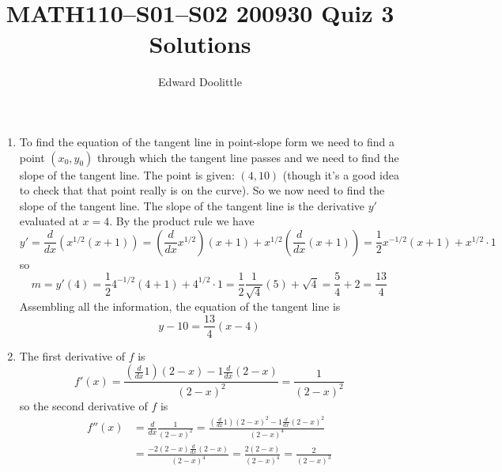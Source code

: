 \documentclass[12pt]{article}
\title{MATH110--S01--S02 200930 Quiz 3 Solutions}
\author{Edward Doolittle}
\begin{document}
\maketitle

\begin{enumerate}
\item To find the equation of the tangent line in point-slope form we need
  to find a point $(x_0,y_0)$ through which the tangent line passes and
  we need to find
  the slope of the tangent line.  The point is given: $(4,10)$ (though it's
  a good idea to check that that point really is on the curve).  So we now need
  to find the slope of the tangent line.  The slope of the tangent line
  is the derivative $y'$ evaluated at $x=4$.  By the product rule we have
  \begin{equation*}
    y' = \frac{d}{dx} \left(x^{1/2} (x+1)\right)
    = \left(\frac{d}{dx} x^{1/2} \right) (x+1) 
    + x^{1/2} \left(\frac{d}{dx} (x+1) \right)
    = \frac{1}{2} x^{-1/2} (x+1) + x^{1/2} \cdot 1
  \end{equation*}
  so
  \begin{equation*}
    m = y'(4) = \frac{1}{2} 4^{-1/2} (4+1) + 4^{1/2} \cdot 1
    = \frac{1}{2} \frac{1}{\sqrt{4}} (5) + \sqrt{4}
    = \frac{5}{4} + 2 = \frac{13}{4} 
  \end{equation*}
  Assembling all the information, the equation of the tangent line is
  \begin{equation*}
    y-10 = \frac{13}{4}(x-4)
  \end{equation*}
\item The first derivative of $f$ is
  \begin{equation*}
    f'(x) = \frac{\left(\frac{d}{dx} 1\right)(2-x) 
    - 1 \frac{d}{dx} (2-x)}{(2-x)^2}
    = \frac{1}{(2-x)^2}
  \end{equation*}
  so the second derivative of $f$ is
  \begin{align*}
    f''(x) 
    &= \frac{d}{dx} \frac{1}{(2-x)^2}
    = \frac{\left(\frac{d}{dx} 1\right)(2-x)^2 - 1\frac{d}{dx} (2-x)^2}{(2-x)^4}
    \\
    &= \frac{-2(2-x)\frac{d}{dx}(2-x)}{(2-x)^4}
    = \frac{2(2-x)}{(2-x)^4}
    = \frac{2}{(2-x)^3}
  \end{align*}
\end{enumerate}
\end{document}
